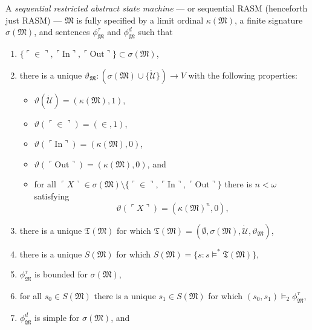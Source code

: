 \documentclass[12pt]{article}
\numberwithin{equation}{section}
\begin{document}
\begin{defi}\label{def224}
A \emph{sequential restricted abstract state machine} --- or sequential RASM (henceforth just RASM) --- $\mathfrak{M}$ is fully specified by a limit ordinal $\kappa(\mathfrak{M})$, a finite signature $\sigma(\mathfrak{M})$, and sentences $\phi^{\tau}_{\mathfrak{M}}$ and $\phi^d_{\mathfrak{M}}$ such that
\begin{enumerate}[label=(D\arabic*)]
    \item $\{\ulcorner \in \urcorner, \ulcorner \mathrm{In} \urcorner, \ulcorner \mathrm{Out} \urcorner\} \subset \sigma(\mathfrak{M})$,
    \item there is a unique $\vartheta_{\mathfrak{M}} : (\sigma(\mathfrak{M}) \cup \{\dot{\mathcal{U}}\}) \longrightarrow V$ with the following properties:
    \begin{itemize}
        \item $\vartheta(\dot{\mathcal{U}}) = (\kappa(\mathfrak{M}), 1)$,
        \item $\vartheta(\ulcorner \in \urcorner) = (\in, 1)$,
        \item $\vartheta(\ulcorner \mathrm{In} \urcorner) = (\kappa(\mathfrak{M}), 0)$,
        \item $\vartheta(\ulcorner \mathrm{Out} \urcorner) = (\kappa(\mathfrak{M}), 0)$, and
        \item for all $\ulcorner X \urcorner \in \sigma(\mathfrak{M}) \setminus \{\ulcorner \in \urcorner, \ulcorner \mathrm{In} \urcorner, \ulcorner \mathrm{Out} \urcorner\}$ there is $n < \omega$ satisfying 
        \begin{equation*}
            \vartheta(\ulcorner X \urcorner) = (\kappa(\mathfrak{M})^n, 0) \text{,}
        \end{equation*}
    \end{itemize}
    \item there is a unique $\mathfrak{T}(\mathfrak{M})$ for which $\mathfrak{T}(\mathfrak{M}) = (\emptyset, \sigma(\mathfrak{M}), \dot{\mathcal{U}}, \vartheta_{\mathfrak{M}})$,
    \item there is a unique $S(\mathfrak{M})$ for which $S(\mathfrak{M}) = \{s : s \models^* \mathfrak{T}(\mathfrak{M})\}$,
    \item $\phi^{\tau}_{\mathfrak{M}}$ is bounded for $\sigma(\mathfrak{M})$, 
    \item for all $s_0 \in S(\mathfrak{M})$ there is a unique $s_1 \in S(\mathfrak{M})$ for which $(s_0, s_1) \models_2 \phi^{\tau}_{\mathfrak{M}}$,
    \item $\phi^d_{\mathfrak{M}}$ is simple for $\sigma(\mathfrak{M})$, and

\end{enumerate}
\end{defi}
\end{document}
